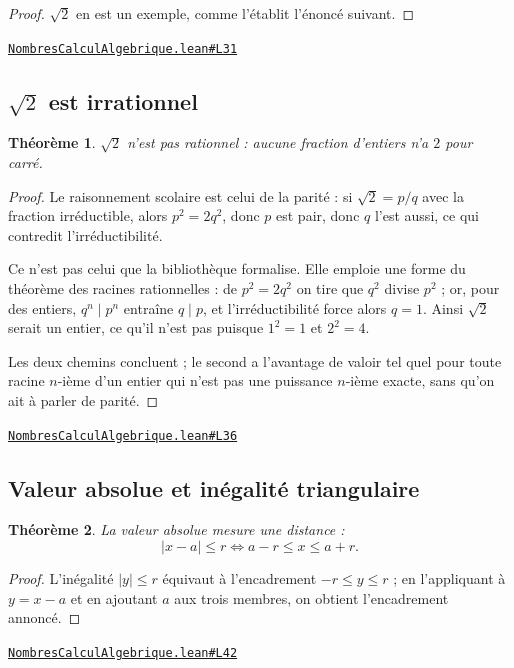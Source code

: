 \documentclass[11pt,a4paper]{article}
\theoremstyle{definition}
\theoremstyle{plain}
\newtheorem{theoreme}{Théorème}
\newcommand{\source}[2]{\par\smallskip\noindent\hfill{\footnotesize\href{#1}{\texttt{#2}}}\par\smallskip}
\begin{document}
\begin{proof}
$\sqrt2$ en est un exemple, comme l'établit l'énoncé suivant.
\end{proof}
\source{https://github.com/Commutator-IO/learn-lean/blob/main/courses/02-lycee/01-nombres-calcul-algebrique/NombresCalculAlgebrique.lean\#L31}{NombresCalculAlgebrique.lean\#L31}

\subsection{\texttt{\(\sqrt{2}\)} est irrationnel}

\begin{theoreme}
$\sqrt2$ n'est pas rationnel : aucune fraction d'entiers n'a $2$ pour carré.
\end{theoreme}

\begin{proof}
Le raisonnement scolaire est celui de la parité : si $\sqrt2 = p/q$ avec la fraction
irréductible, alors $p^2 = 2q^2$, donc $p$ est pair, donc $q$ l'est aussi, ce qui contredit
l'irréductibilité.

Ce n'est pas celui que la bibliothèque formalise. Elle emploie une forme du théorème des
racines rationnelles : de $p^2 = 2q^2$ on tire que $q^2$ divise $p^2$ ; or, pour des
entiers, $q^n \mid p^n$ entraîne $q \mid p$, et l'irréductibilité force alors $q = 1$. Ainsi
$\sqrt2$ serait un entier, ce qu'il n'est pas puisque $1^2 = 1$ et $2^2 = 4$.

Les deux chemins concluent ; le second a l'avantage de valoir tel quel pour toute racine
$n$-ième d'un entier qui n'est pas une puissance $n$-ième exacte, sans qu'on ait à parler de
parité.
\end{proof}
\source{https://github.com/Commutator-IO/learn-lean/blob/main/courses/02-lycee/01-nombres-calcul-algebrique/NombresCalculAlgebrique.lean\#L36}{NombresCalculAlgebrique.lean\#L36}

\subsection{Valeur absolue et inégalité triangulaire}

\begin{theoreme}
La valeur absolue mesure une distance :
\[ |x - a| \le r \iff a - r \le x \le a + r . \]
\end{theoreme}

\begin{proof}
L'inégalité $|y| \le r$ équivaut à l'encadrement $-r \le y \le r$ ; en l'appliquant à
$y = x - a$ et en ajoutant $a$ aux trois membres, on obtient l'encadrement annoncé.
\end{proof}
\source{https://github.com/Commutator-IO/learn-lean/blob/main/courses/02-lycee/01-nombres-calcul-algebrique/NombresCalculAlgebrique.lean\#L42}{NombresCalculAlgebrique.lean\#L42}
\end{document}
